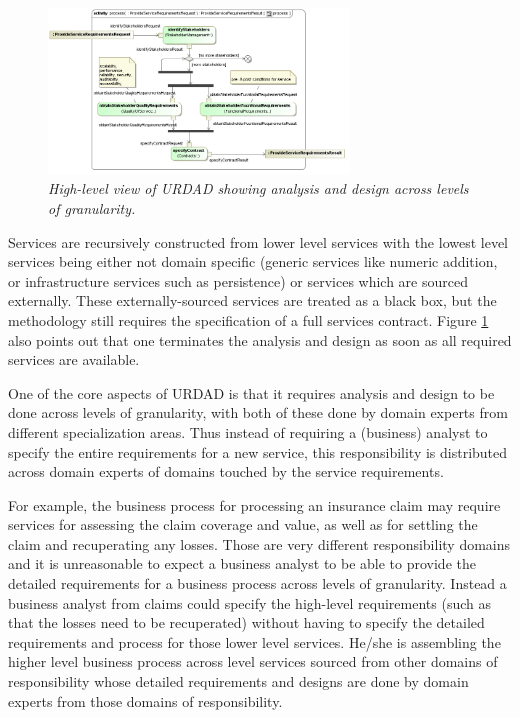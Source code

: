 \begin{figure}[ht!]
  \begin{center}
    \includegraphics[width=8cm]{urdadHighLevel}
    \caption{\it High-level view of URDAD showing analysis and design across levels of granularity.}
    \label{fig:urdadHighLevel}
  \end{center}
\end{figure}

Services are recursively constructed from lower level services
with the lowest level services being either not domain specific 
(generic services like numeric addition, or infrastructure services 
such as persistence) or services which are sourced externally. 
These externally-sourced services are treated as a black box, 
but the methodology still requires the specification of a full 
services contract.
Figure \ref{fig:urdadHighLevel} also points out that one terminates the 
analysis and design as soon as all required services are available.

One of the core aspects of URDAD is that it requires analysis
and design to be done across levels of granularity, with both
of these done by domain experts from different specialization
areas. Thus instead of requiring a (business) analyst
to specify the entire requirements for a new service,
this responsibility is distributed across domain experts of
domains touched by the service requirements.

For example, the business
process for processing an insurance claim may require services
for assessing the claim coverage and value, as well as for
settling the claim and recuperating any losses. Those are
very different responsibility domains and it is unreasonable
to expect a business analyst to be able to provide the detailed
requirements for a business process across levels of
granularity. Instead a business analyst from claims could specify the high-level 
requirements (such as that the losses need to be recuperated)
without having to specify the detailed requirements and process
for those lower level services. He/she is assembling the higher
level business process across level services sourced from other
domains of responsibility whose detailed requirements and designs
are done by domain experts from those domains of responsibility.


